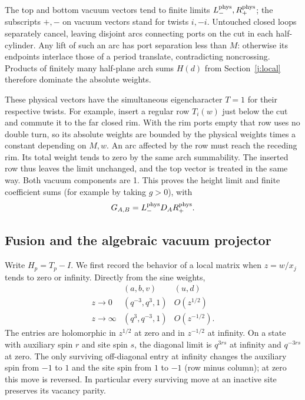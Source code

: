 The top and bottom vacuum vectors tend to finite limits
$L_-^{\rm phys},R_+^{\rm phys}$; the subscripts $+,-$ on vacuum vectors
stand for twists $i,-i$. Untouched closed loops separately cancel,
leaving disjoint arcs connecting ports on the cut in each half-cylinder.
Any lift of such an arc has port separation less than $M$: otherwise its
endpoints interlace those of a period translate, contradicting
noncrossing. Products of finitely many half-plane arch sums $H(d)$ from
Section~\ref{j:local} therefore dominate the absolute weights.

These physical vectors have the simultaneous eigencharacter $T=1$ for
their respective twists. For example, insert a regular row $T_i(w)$
just below the cut and commute it to the far closed rim. With the rim
ports empty that row uses no double turn, so its absolute weights are
bounded by the physical weights times a constant depending on $M,w$.
An arc affected by the row must reach the receding rim. Its total weight
tends to zero by the same arch summability. The inserted row thus leaves
the limit unchanged, and the top vector is treated in the same way.
Both vacuum components are 1. This proves the height limit and finite
coefficient sums (for example by taking $g>0$), with
\[
G_{A,B}=L_-^{\rm phys}D_A R_+^{\rm phys}.
\]

\subsection{Fusion and the algebraic vacuum projector}

Write $H_p=T_p-I$. We first record the behavior of a local matrix when
$z=w/x_j$ tends to zero or infinity. Directly from the sine weights,
\[
\begin{array}{c|c|c}
 & (a,b,v)&(u,d)\\ \hline
z\to0&(q^{-3},q^3,1)&O(z^{1/2})\\
z\to\infty&(q^3,q^{-3},1)&O(z^{-1/2}).
\end{array}
\]
The entries are holomorphic in $z^{1/2}$ at zero and in $z^{-1/2}$ at
infinity. On a state with auxiliary spin $r$ and site spin $s$, the
diagonal limit is $q^{3rs}$ at infinity and $q^{-3rs}$ at zero. The
only surviving off-diagonal entry at infinity changes the auxiliary
spin from $-1$ to $1$ and the site spin from $1$ to $-1$ (row minus
column); at zero this move is reversed. In particular every surviving
move at an inactive site preserves its vacancy parity.

